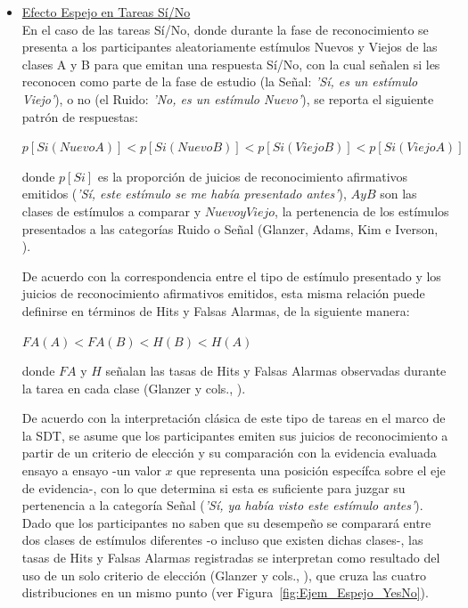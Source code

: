 \begin{itemize}
\item \underline{Efecto Espejo en Tareas Sí/No}\\

En el caso de las tareas Sí/No, donde durante la fase de reconocimiento se presenta a los participantes aleatoriamente estímulos Nuevos y Viejos de las clases A y B para que emitan una respuesta Sí/No, con la cual señalen si les reconocen como parte de la fase de estudio (la Señal: \textit{'Sí, es un estímulo Viejo'}), o no (el Ruido: \textit{'No, es un estímulo Nuevo'}), se reporta el siguiente patrón de respuestas:\\

\begin{center}
$p[Si(NuevoA)] < p[Si(NuevoB)] < p[Si(ViejoB)] < p[Si(ViejoA)]$\\
\end{center}
\begin{center}
donde $p[Si]$ es la proporción de juicios de reconocimiento afirmativos emitidos (\textit{'Sí, este estímulo se me había presentado antes'}), $A y B$ son las clases de estímulos a comparar y $Nuevo y Viejo$, la pertenencia de los estímulos presentados a las categorías Ruido o Señal (Glanzer, Adams, Kim e Iverson, \citeyear{Glanzer1993}).\\
\end{center}

De acuerdo con la correspondencia entre el tipo de estímulo presentado y los juicios de reconocimiento afirmativos emitidos, esta misma relación puede definirse en términos de Hits y Falsas Alarmas, de la siguiente manera:\\

\begin{center}
$FA(A) < FA(B) < H(B) < H(A)$\\
\end{center}
\begin{center}
donde $FA$ y $H$ señalan las tasas de Hits y Falsas Alarmas observadas durante la tarea en cada clase (Glanzer y cols., \citeyear{Glanzer1993}).\\
\end{center}

De acuerdo con la interpretación clásica de este tipo de tareas en el marco de la SDT, se asume que los participantes emiten sus juicios de reconocimiento a partir de un criterio de elección y su comparación con la evidencia evaluada ensayo a ensayo -un valor $x$ que representa una posición específca sobre el eje de evidencia-, con lo que determina si esta es suficiente para juzgar su pertenencia a la categoría Señal (\textit{'Sí, ya había visto este estímulo antes'}). Dado que los participantes no saben que su desempeño se comparará entre dos clases de estímulos diferentes -o incluso que existen dichas clases-, las tasas de Hits y Falsas Alarmas registradas se interpretan como resultado del uso de un solo criterio de elección (Glanzer y cols., \citeyear{Glanzer1993}), que cruza las cuatro distribuciones en un mismo punto (ver Figura~\ref{fig:Ejem_Espejo_YesNo}).\\


\end{itemize}
